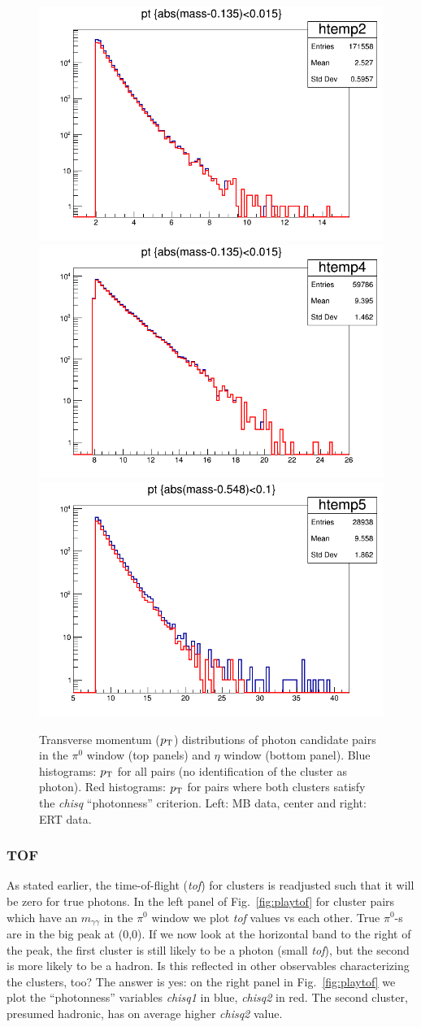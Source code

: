 \documentclass[pdftex,12pt,letter]{article}
\newcommand{\piz}{\mbox{$\pi^0$}\xspace}
\newcommand{\pt}{\mbox{$p_{\rm T}$}\xspace}
\newcommand{\mgg}{\mbox{$m_{\gamma\gamma}$}\xspace}
\begin{document}
\begin{center}
\begin{figure}[htbp]
  \includegraphics[width=0.33\linewidth]{figs/mbpi0pt.png}
  \includegraphics[width=0.33\linewidth]{figs/ertpi0pt.png}
  \includegraphics[width=0.33\linewidth]{figs/ertetapt.png}
  \caption{Transverse momentum (\pt) distributions of photon candidate
    pairs in the \piz window (top panels) and $\eta$ window (bottom
    panel).  Blue histograms: \pt for all pairs (no identification of
    the cluster as photon).  Red histograms: \pt for pairs where both
    clusters satisfy the {\it chisq} ``photonness'' criterion.
    Left: MB data, center and right: ERT data.
  }
    \label{fig:pizeta_pt}
\end{figure}
\end{center}

\subsubsection{TOF}
As stated earlier, the time-of-flight ({\it tof}) for clusters is
readjusted such that it will be zero for true photons.  In the left
panel of Fig.~\ref{fig:playtof} for cluster pairs which have an \mgg
in the \piz window we plot {\it tof} values vs each other.  True
\piz-s are in the big peak at (0,0).  If we now look at the horizontal
band to the right of the peak, the first cluster is still likely to be
a photon (small {\it tof}), but the second is more likely to be a
hadron.  Is this reflected in other observables characterizing the
clusters, too?  The answer is yes: on the right panel in
Fig.~\ref{fig:playtof} we plot the ``photonness'' variables 
{\it chisq1} in blue, {\it chisq2} in red.  The second cluster,
presumed hadronic, has on average higher {\it chisq2} value.
\end{document}
